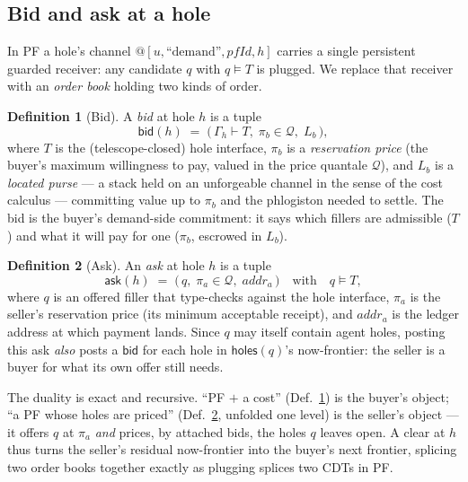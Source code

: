 \documentclass[11pt]{article}
\theoremstyle{definition}
\newtheorem{definition}{Definition}
\newcommand{\PF}{\textsf{PF}}
\newcommand{\CDT}{\textsf{CDT}}
\newcommand{\holes}{\textsf{holes}}
\newcommand{\Qval}{\mathcal{Q}}            %
\newcommand{\modelsT}{\models}
\newcommand{\bid}{\textsf{bid}}
\newcommand{\ask}{\textsf{ask}}
\begin{document}
\subsection{Bid and ask at a hole}
In \PF{} a hole's channel $@[u,\text{``demand''},pfId,h]$ carries a single persistent guarded
receiver: any candidate $q$ with $q \modelsT T$ is plugged. We replace that receiver with an
\emph{order book} holding two kinds of order.

\begin{definition}[Bid]\label{def:bid}
A \emph{bid} at hole $h$ is a tuple
\[
\bid(h)\;=\;\big(\,\Gamma_h \vdash T,\; \pi_b \in \Qval,\; L_b \,\big),
\]
where $T$ is the (telescope-closed) hole interface, $\pi_b$ is a \emph{reservation price} (the
buyer's maximum willingness to pay, valued in the price quantale $\Qval$), and $L_b$ is a
\emph{located purse} --- a stack held on an unforgeable channel in the sense of the cost calculus ---
committing value up to $\pi_b$ and the phlogiston needed to settle. The bid is the buyer's
demand-side commitment: it says which fillers are admissible ($T$) and what it will pay for one
($\pi_b$, escrowed in $L_b$).
\end{definition}

\begin{definition}[Ask]\label{def:ask}
An \emph{ask} at hole $h$ is a tuple
\[
\ask(h)\;=\;\big(\,q,\; \pi_a \in \Qval,\; \mathit{addr}_a \,\big)
\quad\text{with}\quad q \modelsT T,
\]
where $q$ is an offered filler that type-checks against the hole interface, $\pi_a$ is the seller's
reservation price (its minimum acceptable receipt), and $\mathit{addr}_a$ is the ledger address at
which payment lands. Since $q$ may itself contain agent holes, posting this ask \emph{also} posts a
$\bid$ for each hole in $\holes(q)$'s now-frontier: the seller is a buyer for what its own offer
still needs.
\end{definition}

\noindent The duality is exact and recursive. ``\PF{} $+$ a cost'' (Def.~\ref{def:bid}) is the
buyer's object; ``a \PF{} whose holes are priced'' (Def.~\ref{def:ask}, unfolded one level) is the
seller's object --- it offers $q$ at $\pi_a$ \emph{and} prices, by attached bids, the holes $q$
leaves open. A clear at $h$ thus turns the seller's residual now-frontier into the buyer's next
frontier, splicing two order books together exactly as plugging splices two \CDT{}s in \PF{}.
\end{document}
